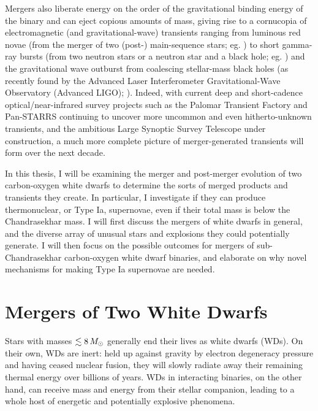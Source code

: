 Mergers also liberate energy on the order of the gravitational binding energy of the binary and can eject copious amounts of mass, giving rise to a cornucopia of electromagnetic (and gravitational-wave) transients ranging from luminous red novae (from the merger of two (post-) main-sequence stars; eg. \citealt{tyle+11, nandil14}) to short gamma-ray bursts (from two neutron stars or a neutron star and a black hole; eg. \citealt{ross15}) and the gravitational wave outburst from coalescing stellar-mass black holes (as recently found by the Advanced Laser Interferometer Gravitational-Wave Observatory (Advanced LIGO); \citealt{ligo16}).  Indeed, with current deep and short-cadence optical/near-infrared survey projects such as the Palomar Transient Factory \citep{rau+09} and Pan-STARRS \citep{kais+10} continuing to uncover more uncommon and even hitherto-unknown transients, and the ambitious Large Synoptic Survey Telescope \citep{lsst09} under construction, a much more complete picture of merger-generated transients will form over the next decade.

In this thesis, I will be examining the merger and post-merger evolution of two carbon-oxygen white dwarfs to determine the sorts of merged products and transients they create.  In particular, I investigate if they can produce thermonuclear, or Type Ia, supernovae, even if their total mass is below the Chandrasekhar mass.  I will first discuss the mergers of white dwarfs in general, and the diverse array of unusual stars and explosions they could potentially generate.  I will then focus on the possible outcomes for mergers of sub-Chandrasekhar carbon-oxygen white dwarf binaries, and elaborate on why novel mechanisms for making Type Ia supernovae are needed.


\section{Mergers of Two White Dwarfs}
\label{sec:c1_wdmergers}

Stars with masses $\lesssim8\,\Msun$ generally end their lives as white dwarfs (WDs).  On their own, WDs are inert: held up against gravity by electron degeneracy pressure and having ceased nuclear fusion, they will slowly radiate away their remaining thermal energy over billions of years.  WDs in interacting binaries, on the other hand, can receive mass and energy from their stellar companion, leading to a whole host of energetic and potentially explosive phenomena.

